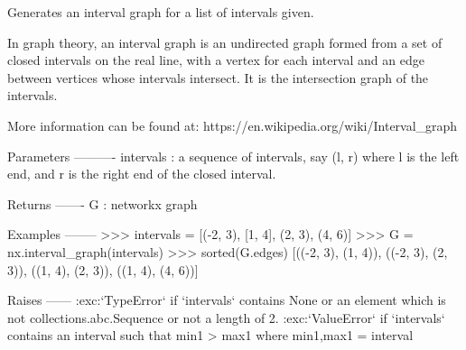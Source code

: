 \begin{DoxyVerb}Generates an interval graph for a list of intervals given.

In graph theory, an interval graph is an undirected graph formed from a set
of closed intervals on the real line, with a vertex for each interval
and an edge between vertices whose intervals intersect.
It is the intersection graph of the intervals.

More information can be found at:
https://en.wikipedia.org/wiki/Interval_graph

Parameters
----------
intervals : a sequence of intervals, say (l, r) where l is the left end,
and r is the right end of the closed interval.

Returns
-------
G : networkx graph

Examples
--------
>>> intervals = [(-2, 3), [1, 4], (2, 3), (4, 6)]
>>> G = nx.interval_graph(intervals)
>>> sorted(G.edges)
[((-2, 3), (1, 4)), ((-2, 3), (2, 3)), ((1, 4), (2, 3)), ((1, 4), (4, 6))]

Raises
------
:exc:`TypeError`
    if `intervals` contains None or an element which is not
    collections.abc.Sequence or not a length of 2.
:exc:`ValueError`
    if `intervals` contains an interval such that min1 > max1
    where min1,max1 = interval
\end{DoxyVerb}
 